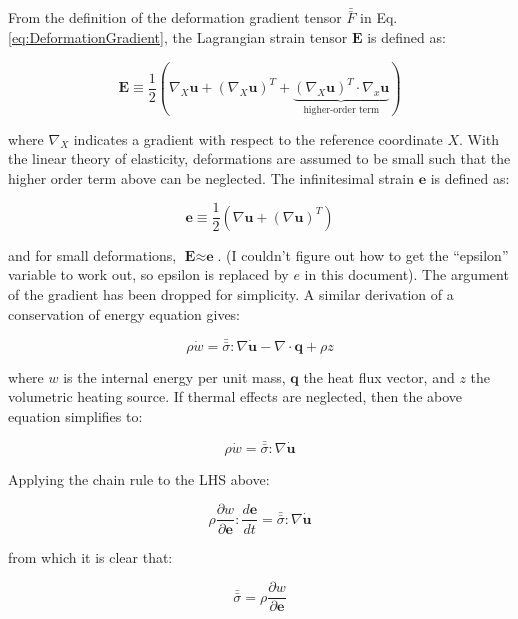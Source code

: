 \documentclass[10pt]{article}
\begin{document}
From the definition of the deformation gradient tensor \(\bar{\bar{F}}\) in Eq. \eqref{eq:DeformationGradient}, the Lagrangian strain tensor \(\textbf{E}\) is defined as:

\begin{equation}
\textbf{E}\equiv\frac{1}{2}\left(\nabla_X\textbf{u}+(\nabla_X\textbf{u})^T+\underbrace{(\nabla_X\textbf{u})^T\cdot\nabla_x\textbf{u}}_\text{higher-order term}\right)
\end{equation}

where \(\nabla_X\) indicates a gradient with respect to the reference coordinate \(X\). With the linear theory of elasticity, deformations are assumed to be small such that the higher order term above can be neglected. The infinitesimal strain \(\textbf{e}\) is defined as:

\begin{equation}
\textbf{e}\equiv\frac{1}{2}\left(\nabla\textbf{u}+(\nabla \textbf{u})^T\right)
\end{equation}

and for small deformations, \(\textbf{E}\approx\textbf{e}\). (I couldn't figure out how to get the ``epsilon'' variable to work out, so epsilon is replaced by \(e\) in this document). The argument of the gradient has been dropped for simplicity. A similar derivation of a conservation of energy equation gives:

\begin{equation}
\rho\dot{w}=\bar{\bar{\sigma}}:\nabla\dot{\textbf{u}}-\nabla\cdot\textbf{q}+\rho z
\end{equation}

where \(w\) is the internal energy per unit mass, \(\textbf{q}\) the heat flux vector, and \(z\) the volumetric heating source. If thermal effects are neglected, then the above equation simplifies to:

\begin{equation}
\rho\dot{w}=\bar{\bar{\sigma}}:\nabla\dot{\textbf{u}}
\end{equation}

Applying the chain rule to the LHS above:

\begin{equation}
\rho\frac{\partial w}{\partial \textbf{e}}:\frac{d\textbf{e}}{dt}=\bar{\bar{\sigma}}:\nabla\dot{\textbf{u}}
\end{equation}

from which it is clear that:

\begin{equation}
\label{eq:StressDef}
\bar{\bar{\sigma}}=\rho\frac{\partial w}{\partial\textbf{e}}
\end{equation}
\end{document}
